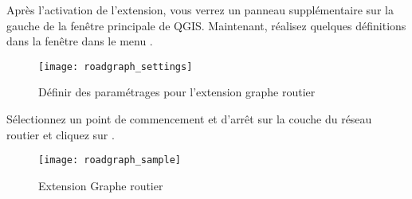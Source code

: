 
Après l'activation de l'extension, vous verrez un panneau supplémentaire sur la gauche de la fenêtre principale de QGIS. Maintenant, réalisez quelques définitions dans la fenêtre  dans le menu  \arrow {}. 

\begin{figure}[ht]
    \centering
    \texttt{[image: roadgraph\_settings]}
    \caption{Définir des paramétrages pour l'extension graphe routier \nixcaption}\label{fig:roadgraphsettings}
\end{figure}

Sélectionnez un point de commencement et d'arrêt sur la couche du réseau routier et cliquez sur .

\begin{figure}[ht]
    \centering
    \texttt{[image: roadgraph\_sample]}
    \caption{Extension Graphe routier \nixcaption}\label{fig:roadgraphsample}
\end{figure}

\FloatBarrier
